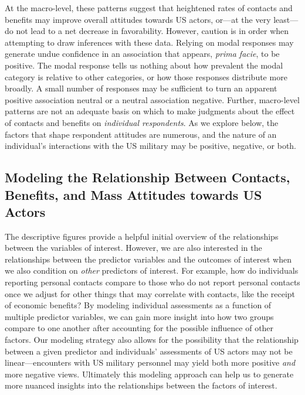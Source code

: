 At the macro-level, these patterns suggest that heightened rates of contacts and benefits may improve overall attitudes towards US actors, or---at the very least---do not lead to a net decrease in favorability. However, caution is in order when attempting to draw inferences with these data. Relying on modal responses may generate undue confidence in an association that appears, \textit{prima facie}, to be positive. The modal response tells us nothing about how prevalent the modal category is relative to other categories, or how those responses distribute more broadly. A small number of responses may be sufficient to turn an apparent positive association neutral or a neutral association negative. Further, macro-level patterns are not an adequate basis on which to make judgments about the effect of contacts and benefits on \textit{individual respondents}. As we explore below, the factors that shape respondent attitudes are numerous, and the nature of an individual's interactions with the US military may be positive, negative, or both.


\subsection*{Modeling the Relationship Between Contacts, Benefits, and Mass Attitudes towards US Actors}

The descriptive figures provide a helpful initial overview of the relationships between the variables of interest. However, we are also interested in the relationships between the predictor variables and the outcomes of interest when we also condition on \textit{other} predictors of interest. For example, how do individuals reporting personal contacts compare to those who do not report personal contacts once we adjust for other things that may correlate with contacts, like the receipt of economic benefits? By modeling individual assessments as a function of multiple predictor variables, we can gain more insight into how two groups compare to one another after accounting for the possible influence of other factors. Our modeling strategy also allows for the possibility that the relationship between a given predictor and individuals' assessments of US actors may not be linear---encounters with US military personnel may yield both more positive \textit{and} more negative views. Ultimately this modeling approach can help us to generate more nuanced insights into the relationships between the factors of interest. 

